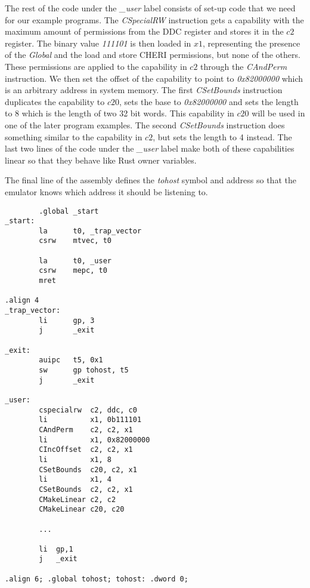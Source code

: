 The rest of the code under the \textit{\_user} label consists of set-up code that we need for our example programs.
The \textit{CSpecialRW} instruction gets a capability with the maximum amount of permissions from the DDC register and stores it in the $c2$ register.
The binary value \textit{111101} is then loaded in $x1$, representing the presence of the \textit{Global} and the load and store CHERI permissions, but none of the others.
These permissions are applied to the capability in $c2$ through the \textit{CAndPerm} instruction.
We then set the offset of the capability to point to \textit{0x82000000} which is an arbitrary address in system memory.
The first \textit{CSetBounds} instruction duplicates the capability to $c20$, sets the base to \textit{0x82000000} and sets the length to 8 which is the length of two 32 bit words.
This capability in $c20$ will be used in one of the later program examples.
The second \textit{CSetBounds} instruction does something similar to the capability in $c2$, but sets the length to 4 instead.
The last two lines of the code under the \textit{\_user} label make both of these capabilities linear so that they behave like Rust owner variables.

The final line of the assembly defines the \textit{tohost} symbol and address so that the emulator knows which address it should be listening to.
\begin{verbatim}
        .global _start
_start:
        la      t0, _trap_vector
        csrw	mtvec, t0

        la      t0, _user
        csrw    mepc, t0
        mret

.align 4
_trap_vector:
        li      gp, 3
        j       _exit

_exit:
        auipc   t5, 0x1
        sw      gp tohost, t5
        j       _exit

_user:
        cspecialrw  c2, ddc, c0
        li          x1, 0b111101
        CAndPerm    c2, c2, x1
        li          x1, 0x82000000
        CIncOffset  c2, c2, x1
        li          x1, 8
        CSetBounds  c20, c2, x1
        li          x1, 4
        CSetBounds  c2, c2, x1
        CMakeLinear c2, c2
        CMakeLinear c20, c20
        
        ...
        
        li  gp,1
        j   _exit

.align 6; .global tohost; tohost: .dword 0;
\end{verbatim}


